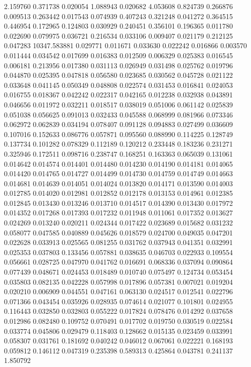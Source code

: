 2.159760
0.371738
0.020054
1.088943
0.020682
4.053608
0.824739
0.266876
0.009513
0.263442
0.017543
0.074939
0.407243
0.321248
0.041272
0.364515
0.446954
0.172965
0.124803
0.030929
0.240451
0.356101
0.196365
0.011780
0.022690
0.079975
0.036721
0.216534
0.033106
0.009407
0.021179
0.212125
0.047283
10347.583881
0.029771
0.011671
0.033630
0.022242
0.016866
0.003570
0.011444
0.034542
0.017699
0.016383
0.012509
0.006329
0.025383
0.016545
0.006181
0.213956
0.017380
0.031113
0.026949
0.031498
0.025762
0.019796
0.044870
0.025395
0.047818
0.056580
0.023685
0.030562
0.045728
0.021122
0.033648
0.041145
0.050349
0.048808
0.022574
0.031453
0.016841
0.024053
0.016755
0.018367
0.042242
0.022317
0.042165
0.012238
0.032938
0.043891
0.046656
0.011972
0.032211
0.018517
0.038019
0.051006
0.061142
0.025839
0.051038
0.056625
0.091013
0.032433
0.045588
0.068999
0.081966
0.073346
0.062972
0.062839
0.034194
0.078407
0.091128
0.094883
0.027499
0.036609
0.107016
0.152633
0.086776
0.057871
0.095560
0.088990
0.114225
0.128749
0.137734
0.101282
0.078329
0.112189
0.120212
0.233448
0.183236
0.231271
0.325946
0.172511
0.098716
0.238747
0.168251
0.163363
0.065039
0.131061
0.014642
0.014574
0.014401
0.014480
0.014230
0.014190
0.014181
0.014065
0.014420
0.014765
0.014727
0.014499
0.014730
0.014759
0.014749
0.014663
0.014681
0.014639
0.014051
0.014024
0.013820
0.014171
0.013590
0.014003
0.012785
0.014020
0.012981
0.012852
0.012178
0.013153
0.014961
0.012385
0.012845
0.013430
0.013246
0.013710
0.014517
0.014390
0.013430
0.017972
0.014352
0.017268
0.017393
0.017232
0.011948
0.011061
0.017352
0.013627
0.024269
0.013240
0.020211
0.024344
0.017422
0.023689
0.015682
0.031232
0.058077
0.047585
0.040889
0.045626
0.018579
0.024700
0.049035
0.047201
0.022628
0.033913
0.025565
0.081255
0.031762
0.037943
0.041351
0.032991
0.025353
0.037803
0.133456
0.057881
0.038635
0.046703
0.022933
0.109554
0.056661
0.028725
0.047970
0.041762
0.016691
0.068336
0.037094
0.090864
0.077439
0.048671
0.024453
0.018489
0.010740
0.075497
0.124734
0.053454
0.035803
0.082135
0.042228
0.057998
0.017896
0.057381
0.007021
0.019204
0.020210
0.006909
0.044551
0.047161
0.063130
0.024517
0.012541
0.022796
0.071366
0.043454
0.035926
0.028935
0.074614
0.021077
0.101801
0.024955
0.116443
0.032850
0.032803
0.055222
0.017824
0.078476
0.014292
0.037658
0.012986
0.082480
0.109752
0.070491
0.017702
0.019750
0.030519
0.022584
0.033774
0.045806
0.029479
0.118403
0.128662
0.015135
0.023459
0.033991
0.058307
0.031761
0.181692
0.040242
0.046012
0.067061
0.022221
0.168193
0.059812
0.146112
0.047319
0.235398
0.589313
0.425864
0.043781
0.241137
1.850792
